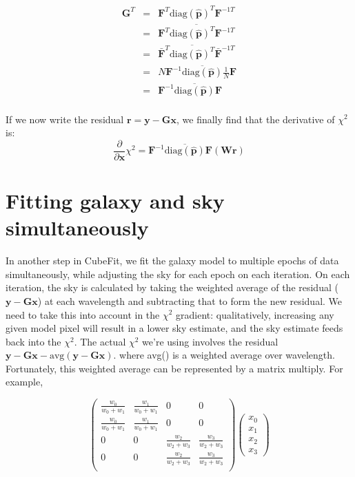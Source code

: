 \documentclass[12pt]{article}
\newcommand{\G}{\mathbf{G}}
\newcommand{\phat}{\mathbf{\hat p}}
\newcommand{\x}{\mathbf{x}}
\newcommand{\y}{\mathbf{y}}
\newcommand{\rvect}{\mathbf{r}}
\newcommand{\W}{\mathbf{W}}
\newcommand{\F}{\mathbf{F}}
\newcommand{\diag}{\mathrm{diag}}
\newcommand{\ddx}{\frac{\partial}{\partial \mathbf{x}}}
\begin{document}
\begin{eqnarray*}
  \G^{T} & = & \F^{T} \diag(\phat)^{T} \F^{-1T}\\
        & = & \overline{\F^{T} \diag(\phat)^{T} \F^{-1T}} \\
        & = & \bar{\F}^T \overline{\diag(\phat)^T} \bar{\F}^{-1T} \\
        & = & N\F^{-1} \overline{\diag(\phat)} \frac{1}{N}\F \\
        & = & \F^{-1} \overline{\diag(\phat)} \F\\
\end{eqnarray*}

If we now write the residual $\rvect = \y - \G\x$, we finally find that the
derivative of $\chi^{2}$ is:
\begin{equation}
  \ddx \chi^{2} = \F^{-1} \overline{\diag(\phat)} \F(\W \rvect)
\end{equation}


\section{Fitting galaxy and sky simultaneously}

In another step in CubeFit, we fit the galaxy model to multiple epochs
of data simultaneously, while adjusting the sky for each epoch on each
iteration.  On each iteration, the sky is calculated by taking the
weighted average of the residual ($\y - \G \x$) at each wavelength and
subtracting that to form the new residual. We need to take this into
account in the $\chi^2$ gradient: qualitatively, increasing any given
model pixel will result in a lower sky estimate, and the sky estimate
feeds back into the $\chi^2$. The actual $\chi^2$ we're using involves
the residual $\y - \G\x - \mathrm{avg}(\y - \G\x)$. where avg() is a
weighted average over wavelength. Fortunately, this weighted average
can be represented by a matrix multiply. For example,

\begin{equation}
  \left( \begin{array}{cccc}
   \frac{w_0}{w_0 + w_1} & \frac{w_1}{w_0 + w_1} & 0 & 0 \\
   \frac{w_0}{w_0 + w_1} & \frac{w_1}{w_0 + w_1} & 0 & 0 \\
   0   & 0   & \frac{w_2}{w_2 + w_3} & \frac{w_3}{w_2 + w_3} \\
   0   & 0   & \frac{w_2}{w_2 + w_3} & \frac{w_3}{w_2 + w_3} \\
   \end{array} \right)
   \left( \begin{array}{c} x_0 \\ x_1 \\ x_2 \\ x_3 \end{array} \right)
\end{equation}
\end{document}
